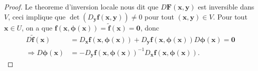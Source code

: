 \begin{proof}
Le theoreme d'inversion locale nous dit que $D\boldsymbol{F}(\boldsymbol{x},\boldsymbol{y})$ est inversible dans $V$, ceci implique que $\det(D_{\boldsymbol{y}}\boldsymbol{f}(\boldsymbol{x},\boldsymbol{y}))\neq 0$ pour tout $(\boldsymbol{x},\boldsymbol{y})\in V$. Pour tout $\boldsymbol{x}\in U$, on a que $\boldsymbol{f}(\boldsymbol{x},\boldsymbol{\phi}(\boldsymbol{x}))=\boldsymbol{\tilde{f}}(\boldsymbol{x})=\boldsymbol{0}$, donc
\begin{align*}
D \tilde{\boldsymbol{f}}(\boldsymbol{x}) & =D_{\boldsymbol{x}}\boldsymbol{f}(\boldsymbol{x},\boldsymbol{\phi}(\boldsymbol{x}))+D_{\boldsymbol{y}}\boldsymbol{f}(\boldsymbol{x},\boldsymbol{\phi}(\boldsymbol{x}))D\boldsymbol{\phi}(\boldsymbol{x})=\boldsymbol{0} \\
\Rightarrow D\boldsymbol{\phi}(\boldsymbol{x}) & =-D_{\boldsymbol{y}}\boldsymbol{f}(\boldsymbol{x},\boldsymbol{\phi}(\boldsymbol{x}))^{-1}D_{\boldsymbol{x}}\boldsymbol{f} (\boldsymbol{x},\boldsymbol{\phi}(\boldsymbol{x})).
\end{align*}
\end{proof}